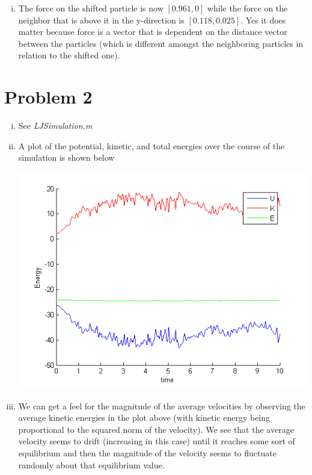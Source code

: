 \documentclass{article}
\begin{document}
\begin{enumerate}[i.]
  \item The force on the shifted particle is now $\left[ 0.961, 0\right]$ while the force on the neighbor that is above it in the y-direction is $\left[ 0.118, 0.025\right]$. Yes it does matter because force is a vector that is dependent on the distance vector between the particles (which is different amongst the neighboring particles in relation to the shifted one).
\end{enumerate}


\section*{Problem 2}
\begin{enumerate}[i.]
  \item See \textit{LJSimulation.m}

  \item A plot of the potential, kinetic, and total energies over the course of the simulation is shown below
    \begin{center}
      \includegraphics[scale=0.5]{2ii}
    \end{center}

  \item We can get a feel for the magnitude of the average velocities by observing the average kinetic energies in the plot above (with kinetic energy being proportional to the squared norm of the velocity). We see that the average velocity seems to drift (increasing in this case) until it reaches some sort of equilibrium and then the magnitude of the velocity seems to fluctuate randomly about that equilibrium value.


\end{enumerate}
\end{document}
